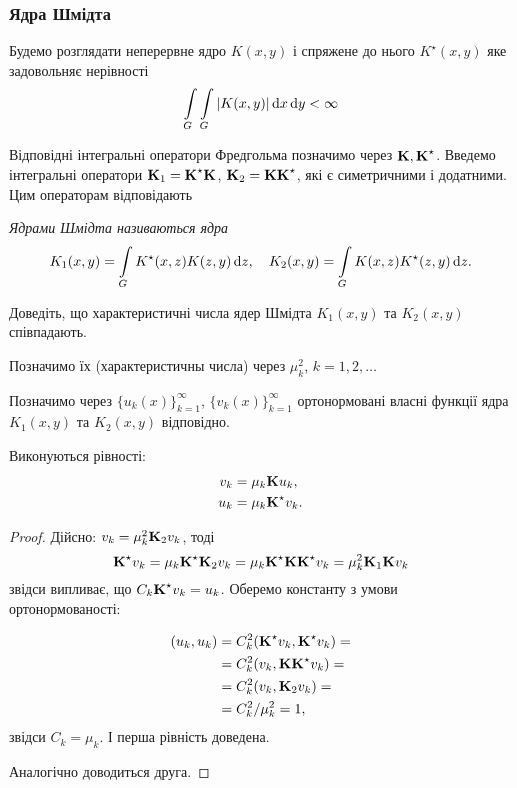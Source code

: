 \subsubsection{Ядра Шмідта}

Будемо розглядати неперервне ядро $K(x, y)$ і спряжене до нього $K^\star (x,y)$ яке задовольняє нерівності
\begin{equation}
	\Int_G\Int_G|K(x,y)|\diff x\diff y<\infty
\end{equation}

Відповідні інтегральні оператори Фредгольма позначимо через $\bf{K}, \bf{K}^\star $. Введемо інтегральні оператори $\bf{K}_1=\bf{K}^\star \bf{K}$, $\bf{K}_2=\bf{K}\bf{K}^\star $, які є симетричними і додатними. Цим операторам відповідають 

\begin{definition}
	\it{Ядрами Шмідта} називаються ядра
	\begin{equation}
		K_1(x, y) = \Int_G K^\star (x, z) K(z, y) \diff z, \quad K_2(x, y) = \Int_G K(x, z) K^\star (z, y) \diff z.
	\end{equation}
\end{definition}

\begin{problem}
    Доведіть, що характеристичні числа ядер Шмідта $K_1(x, y)$ та $K_2(x, y)$ співпадають.
\end{problem}

Позначимо їх (характеристичны числа) через $\mu_k^2$, $k=1,2,\ldots$ \medskip

Позначимо через $\{u_k(x)\}_{k=1}^\infty$, $\{v_k(x)\}_{k=1}^\infty$ ортонормовані власні функції ядра $K_1(x,y)$ та $K_2(x,y)$ відповідно. \medskip

\begin{proposition}
	\label{proposition:2.6.3}
	Виконуються рівності:
	\begin{align}
		v_k&=\mu_k\bf{K}u_k, \\
		u_k&=\mu_k\bf{K}^\star v_k.
	\end{align}
\end{proposition}

\begin{proof}
	Дійсно: $v_k=\mu_k^2\bf{K}_2v_k$, тоді
	\begin{equation}
		\bf{K}^\star v_k=\mu_k\bf{K}^\star \bf{K}_2v_k=\mu_k\bf{K}^\star \bf{K}\bf{K}^\star v_k=\mu_k^2\bf{K}_1\bf{K}v_k
	\end{equation}
	звідси випливає, що $C_k\bf{K}^\star v_k=u_k$. Оберемо константу з умови ортонормованості:

	\begin{equation}
		\begin{aligned}
		(u_k, u_k) &= C_k^2 (\bf{K}^\star v_k, \bf{K}^\star v_k)=\\
		&=C_k^2(v_k,\bf{K}\bf{K}^\star v_k)=\\
		&=C_k^2(v_k,\bf{K}_2v_k)=\\\
		&=C_k^2/\mu_k^2=1,
		\end{aligned}
	\end{equation}
	звідси $C_k = \mu_k$. І перша рівність доведена. \medskip

	Аналогічно доводиться друга.
\end{proof}

